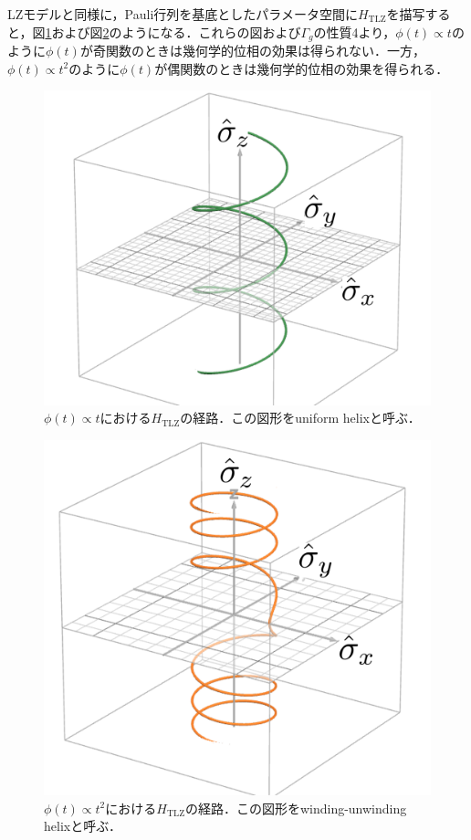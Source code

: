 \documentclass[a4paper, titlepage]{jsreport}
\begin{document}
LZモデルと同様に，Pauli行列を基底としたパラメータ空間に$H_{\mathrm{TLZ}}$を描写すると，図\ref{fig:uniform_helix}および図\ref{fig:winding_helix}のようになる．これらの図および$\Gamma_g$の性質4より，$\phi(t) \propto t$のように$\phi(t)$が奇関数のときは幾何学的位相の効果は得られない．一方，$\phi(t) \propto t^2$のように$\phi(t)$が偶関数のときは幾何学的位相の効果を得られる．

\begin{figure}[htbp]
  \centering
  \includegraphics[scale=0.8]{figures/uniform_helix.png}
  \caption{$\phi(t) \propto t$における$H_{\mathrm{TLZ}}$の経路．この図形をuniform helixと呼ぶ．}
  \label{fig:uniform_helix}
\end{figure}

\begin{figure}[htbp]
  \centering
  \includegraphics[scale=0.8]{figures/winding_helix.png}
  \caption{$\phi(t) \propto t^2$における$H_{\mathrm{TLZ}}$の経路．この図形をwinding-unwinding helixと呼ぶ．}
  \label{fig:winding_helix}
\end{figure}
\end{document}

